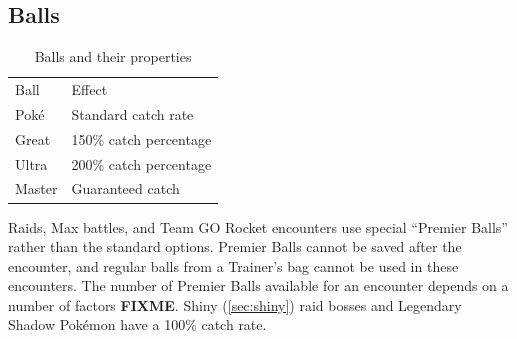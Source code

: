 \subsection{Balls}
\begin{table}[ht]
  \begin{center}
    \begin{tabular}{ll}
      Ball & Effect\\
      \Midrule
      Poké & Standard catch rate\\
      Great & 150\% catch percentage\\
      Ultra & 200\% catch percentage\\
      Master & Guaranteed catch\\
    \end{tabular}
  \end{center}
  \caption{Balls and their properties}
  \label{table:balls}
\end{table}
Raids, Max battles, and Team GO Rocket encounters use special ``Premier Balls''
  rather than the standard options.
Premier Balls cannot be saved after the encounter, and regular balls from
  a Trainer's bag cannot be used in these encounters.
The number of Premier Balls available for an encounter depends on a number of factors \textbf{FIXME}.
Shiny (\autoref{sec:shiny}) raid bosses and Legendary Shadow Pokémon have a 100\% catch rate.

